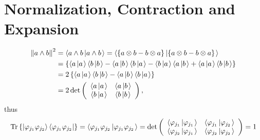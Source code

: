 \documentclass[aps,preprint]{revtex4}%
\begin{document}
\section{Normalization, Contraction and Expansion}%

\begin{align}
\left\Vert a\wedge b\right\Vert ^{2}  &  =\left\langle a\wedge b\left\vert
a\wedge b\right.  \right\rangle =\left\langle \left\{  a\otimes b-b\otimes
a\right\}  \left\vert \left\{  a\otimes b-b\otimes a\right\}  \right.
\right\rangle \nonumber\\
&  =\left\{  \left\langle a\left\vert a\right.  \right\rangle \left\langle
b\left\vert b\right.  \right\rangle -\left\langle a\left\vert b\right.
\right\rangle \left\langle b\left\vert a\right.  \right\rangle -\left\langle
b\left\vert a\right.  \right\rangle \left\langle a\left\vert b\right.
\right\rangle +\left\langle a\left\vert a\right.  \right\rangle \left\langle
b\left\vert b\right.  \right\rangle \right\} \nonumber\\
&  =2\left\{  \left\langle a\left\vert a\right.  \right\rangle \left\langle
b\left\vert b\right.  \right\rangle -\left\langle a\left\vert b\right.
\right\rangle \left\langle b\left\vert a\right.  \right\rangle \right\}
\nonumber\\
&  =2\det\left(
\begin{array}
[c]{cc}%
\left\langle a\left\vert a\right.  \right\rangle  & \left\langle a\left\vert
b\right.  \right\rangle \\
\left\langle b\left\vert a\right.  \right\rangle  & \left\langle b\left\vert
b\right.  \right\rangle
\end{array}
\right)  ,
\end{align}
thus
\begin{equation}
\operatorname*{Tr}\left\{  \left\vert \varphi_{j_{1}}\varphi_{j_{2}%
}\right\rangle \left\langle \varphi_{j_{1}}\varphi_{j_{2}}\right\vert
\right\}  =\left\langle \varphi_{j_{1}}\varphi_{j_{2}}\left\vert
\varphi_{j_{1}}\varphi_{j_{2}}\right.  \right\rangle =\det\left(
\begin{array}
[c]{cc}%
\left\langle \varphi_{j_{1}}\left\vert \varphi_{j_{1}}\right.  \right\rangle
& \left\langle \varphi_{j_{1}}\left\vert \varphi_{j_{2}}\right.  \right\rangle
\\
\left\langle \varphi_{j_{2}}\left\vert \varphi_{j_{1}}\right.  \right\rangle
& \left\langle \varphi_{j_{2}}\left\vert \varphi_{j_{2}}\right.
\right\rangle
\end{array}
\right)  =1
\end{equation}
\end{document}
